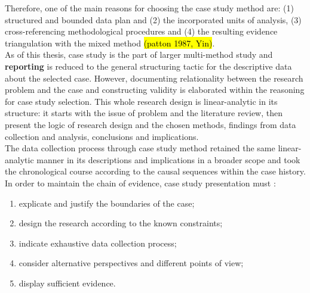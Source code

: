 \documentclass[11pt]{report}
\begin{document}
Therefore, one of the main reasons for choosing the case study method are: (1) structured and bounded data plan and (2) the incorporated units of analysis, (3) cross-referencing methodological procedures and (4) the resulting evidence triangulation with the mixed method \hl{(patton 1987, Yin)}.
\\
As of this thesis, case study is the part of larger multi-method study and \textbf{reporting} is reduced to the general structuring tactic for the descriptive data about the selected case.
However, documenting relationality between the research problem and the case and constructing validity is elaborated within the reasoning for case study selection.
This whole research design is linear-analytic in its structure: it starts with the issue of problem and the literature review, then present the logic of research design and the chosen methods, findings from data collection and analysis, conclusions and implications.
\\
The data collection process through case study method retained the same linear-analytic manner in its descriptions and implications in a broader scope and took the chronological course according to the causal sequences within the case history. In order to maintain the chain of evidence, case study presentation must \cite{(Yin XXX)}:
\begin{enumerate}
\item explicate and justify the boundaries of the case;
\item design the research according to the known constraints;
\item indicate exhaustive data collection process;
\item consider alternative perspectives and different points of view;
\item display sufficient evidence.
\end{enumerate}
\end{document}
